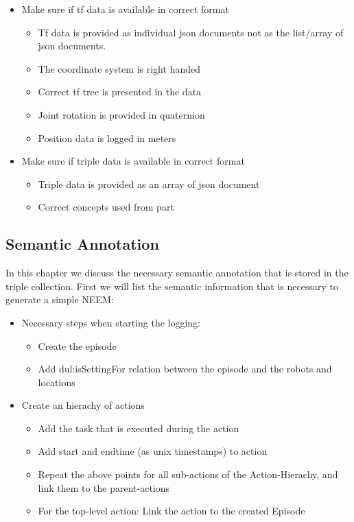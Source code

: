 \begin{itemize}
	\item Make sure if tf data is available in correct format
	\begin{itemize}
		\item Tf data is provided as individual json documents not as the list/array of json documents.
		\item The coordinate system is right handed
		\item Correct tf tree is presented in the data
		\item Joint rotation is provided in quaternion
		\item Position data is logged in meters
	\end{itemize}
	\item Make sure if triple data is available in correct format
	\begin{itemize}
		\item Triple data is provided as an array of json document
		\item Correct \soma concepts used from \neemnar part
	\end{itemize}
\end{itemize}

\subsection{Semantic Annotation}
\label{sec:semantic_annotation}

In this chapter we discuss the necessary semantic annotation that is stored in the triple collection. First we will list the semantic information that is necessary to generate a simple NEEM:

\begin{itemize}
	\item Necessary steps when starting the logging:
	\begin{itemize}
		\item Create the episode
		\item Add dul:isSettingFor relation between the episode and the robots and locations
	\end{itemize}
	\item Create an hierachy of actions
	\begin{itemize}
		\item Add the task that is executed during the action 
		\item Add start and endtime (as unix timestamps) to action
		\item Repeat the above points for all sub-actions of the Action-Hierachy, and link them to the parent-actions
		\item For the top-level action: Link the action to the created Episode
	\end{itemize}
\end{itemize}

